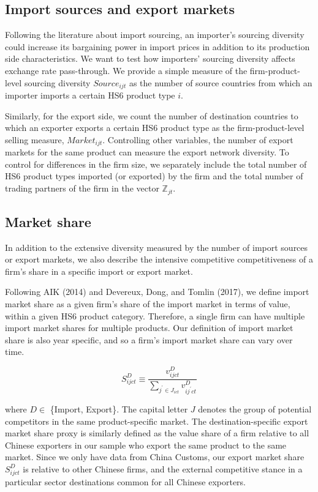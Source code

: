 \subsection{Import sources and export markets}\label{sec-4.2.4}
Following the literature about import sourcing, an importer's sourcing diversity could increase its bargaining power in import prices in addition to its production side characteristics. We want to test how importers' sourcing diversity affects exchange rate pass-through. We provide a simple measure of the firm-product-level sourcing diversity $Source_{ijt}$ as the number of source countries from which an importer imports a certain HS6 product type $i$. 

Similarly, for the export side, we count the number of destination countries to which an exporter exports a certain HS6 product type as the firm-product-level selling measure, $Market_{ijt}$. Controlling other variables, the number of export markets for the same product can measure the export network diversity. To control for differences in the firm size, we separately include the total number of HS6 product types imported (or exported) by the firm and the total number of trading partners of the firm in the vector $\mathbb{Z}_{jt}$.

\subsection{Market share}\label{sec-4.2.5}

In addition to the extensive diversity measured by the number of import sources or export markets, we also describe the intensive competitive competitiveness of a firm's share in a specific import or export market. 

Following AIK (2014)\cite{aik2014} and Devereux, Dong, and Tomlin (2017)\cite{devereux2017}, we define import market share as a given firm’s share of the import market in terms of value, within a given HS6 product category. Therefore, a single firm can have multiple import market shares for multiple products. Our definition of import market share is also year specific, and so a firm’s import market share can vary over time. 

$$
S^{D}_{ijct} \equiv \frac{v^{D}_{ijct}}{\sum_{j^{\prime} \in J_{ict}} v^{D}_{ij^{\prime}ct}}
$$

where $D \in$ \{Import, Export\}. The capital letter $J$ denotes the group of potential competitors in the same product-specific market. The destination-specific export market share proxy is similarly defined as the value share of a firm relative to all Chinese exporters in our sample who export the same product to the same market. Since we only have data from China Customs, our export market share $S^{D}_{ijct}$ is relative to other Chinese firms, and the external competitive stance in a particular sector destinations common for all Chinese exporters.